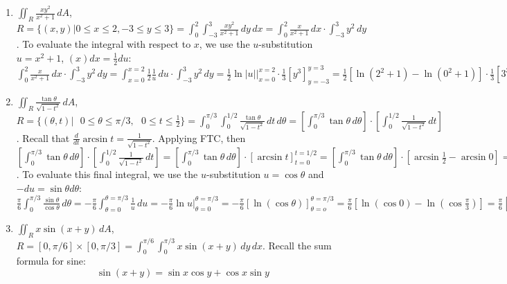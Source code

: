 \begin{Answer}[ref = fubini_2]
\begin{enumerate}
\item $\iint_R \frac{xy^2}{x^2 + 1}\,dA$, $\textit{R} = \{ \left( x, y \right) 
| 0 \leq x \leq 2, -3 \leq y \leq 3 \} = \int_0^2 \int_{-3}^3 \frac{xy^2}{x^2 
+ 1}\,dy\,dx = \int_0^2 \frac{x}{x^2 + 1}\,dx \cdot \int_{-3}^{3} y^2\,dy$. To 
evaluate the integral with respect to $x$, we use the $u$-substitution $u = 
x^2 + 1$, $(x)dx = \frac{1}{2} du$: $\int_0^2 \frac{x}{x^2 + 1}\,dx \cdot 
\int_{-3}^{3} y^2\,dy = \int_{x = 0}^{x = 2} \frac{1}{2} \frac{1}{u}\,du \cdot 
\int_{-3}^3 y^2\,dy = \frac{1}{2} \ln{|u|}|_{x = 0}^{x = 2} \cdot \frac{1}{3} 
\left[ y^3 \right]_{y = -3}^{y = 3} = \frac{1}{2} \left[ \ln{\left( 2^2 + 1 
\right) - \ln{ \left( 0^2 + 1 \right)}} \right] \cdot \frac{1}{3} \left[ 3^3 - 
\left( -3 \right)^3 \right] = \frac{1}{2} \ln{5} \cdot \frac{1}{3} \left( 27 - 
(-27) \right) = \frac{\ln{5}}{2} \frac{54}{3} = 9\ln{5}$
\item $\iint_R \frac{\tan{\theta}}{\sqrt{1 - t^2}}\,dA$, $\textit{R} = \{ 
\left( \theta, t \right) | \text{ } 0 \leq \theta \leq \pi/3, \text{ } 0 \leq 
t \leq \frac{1}{2} \} = \int_0^{\pi/3} \int_0^{1/2} \frac{\tan{\theta}}{\sqrt{
1 - t^2}}\,dt\,d\theta = \left[ \int_0^{\pi/3} \tan{\theta}\,d\theta \right] 
\cdot \left[ \int_0^{1/2} \frac{1}{\sqrt{1 - t^2}}\,dt \right]$. Recall that 
$\frac{d}{dt} \arcsin{t} = \frac{1}{\sqrt{1 - t^2}}$. Applying FTC, then 
$\left[ \int_0^{\pi/3} \tan{\theta}\,d\theta \right] \cdot \left[ \int_0^{1/2} 
\frac{1}{\sqrt{1 - t^2}}\,dt \right] = \left[ \int_0^{\pi/3} \tan{\theta}\,d\theta 
\right] \cdot \left[ \arcsin{t} \right]_{t = 0}^{t = 1/2} = \left[ \int_0^{\pi/
3} \tan{\theta}\,d\theta \right] \cdot \left[ \arcsin{\frac{1}{2}} - \arcsin{0}
\right] = \left[ \int_0^{\pi/3} \tan{\theta}\,d\theta \right] \cdot \left[ 
\frac{\pi}{6} \right] = \frac{\pi}{6} \int_0^{\pi/3} \frac{\sin{\theta}}{\cos{
\theta}}\,d\theta$. To evaluate this final integral, we use the $u$-substitution
$u = \cos{\theta}$ and $-du = \sin{\theta} d\theta$: $\frac{\pi}{6} \int_0^{\pi
/3} \frac{\sin{\theta}}{\cos{\theta}}\,d\theta = -\frac{\pi}{6}\int_{\theta = 0
}^{\theta = \pi/3} \frac{1}{u}\,du = -\frac{\pi}{6} \ln{u}|_{\theta = 0}^{
\theta = \pi/3} = -\frac{\pi}{6} \left[ \ln{ \left( \cos{\theta} \right)} 
\right]_{\theta = o}^{\theta = \pi/3} = \frac{\pi}{6} \left[ \ln{\left( \cos{0} 
\right) - \ln{ \left( \cos{\frac{\pi}{3}} \right)}} \right] = \frac{\pi}{6} 
\left[ \ln{1} - \ln{\frac{1}{2}} \right] = \frac{\pi}{6} \ln{\frac{1}{1/2}} = 
\frac{\pi}{6} \ln{2}$
\item $\iint_R x \sin{ \left( x + y \right) }\,dA$, $\textit{R} = \left[0, 
\pi/6 \right] \times \left[ 0, \pi/3 \right] = \int_0^{\pi/6} \int_0^{\pi/3} x 
\sin{ \left( x + y \right) }\,dy\,dx$. Recall the sum formula for sine:
$$\sin{ \left( x + y \right)} = \sin{x}\cos{y} + \cos{x}\sin{y}$$


\end{enumerate}
\end{Answer}
